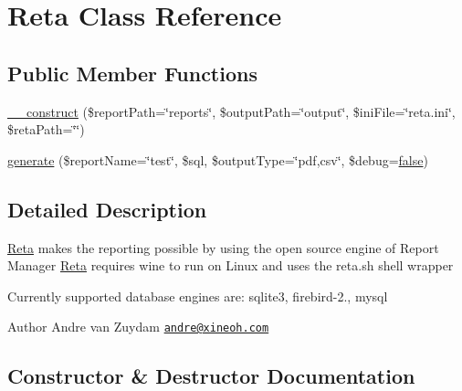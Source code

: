 \hypertarget{classReta}{}\section{Reta Class Reference}
\label{classReta}
\subsection*{Public Member Functions}
\begin{DoxyCompactItemize}
\item 
\hyperlink{classReta_a59ebb4d8111b19bcc2b646352035f88a}{\+\_\+\+\_\+construct} (\$report\+Path=\char`\"{}reports\char`\"{}, \$output\+Path=\char`\"{}output\char`\"{}, \$ini\+File=\char`\"{}reta.\+ini\char`\"{}, \$reta\+Path=\char`\"{}\char`\"{})
\item 
\hyperlink{classReta_a7e909b970b993508a9ff7a5361a58032}{generate} (\$report\+Name=\char`\"{}test\char`\"{}, \$sql, \$output\+Type=\char`\"{}pdf,csv\char`\"{}, \$debug=\hyperlink{tina4_8php_aec2deb5590a84bee262c3bea206ae88f}{false})
\end{DoxyCompactItemize}


\subsection{Detailed Description}
\hyperlink{classReta}{Reta} makes the reporting possible by using the open source engine of Report Manager \hyperlink{classReta}{Reta} requires wine to run on Linux and uses the reta.\+sh shell wrapper

Currently supported database engines are\+: sqlite3, firebird-\/2., mysql

\begin{DoxyAuthor}{Author}
Andre van Zuydam \href{mailto:andre@xineoh.com}{\tt andre@xineoh.\+com} 
\end{DoxyAuthor}


\subsection{Constructor \& Destructor Documentation}
\hypertarget{classReta_a59ebb4d8111b19bcc2b646352035f88a}{}
